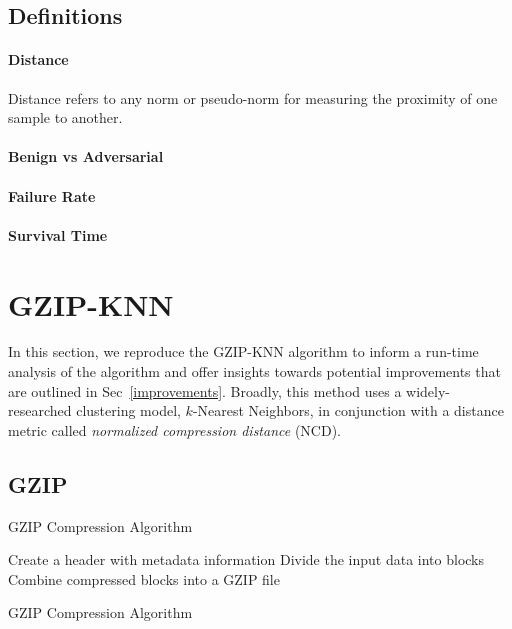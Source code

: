 \documentclass[sigconf]{acmart}
\begin{document}
\subsection{Definitions}
\paragraph{Distance}
Distance refers to any norm or pseudo-norm for measuring the proximity of one sample to another. 
\paragraph{Benign vs Adversarial}
\paragraph{Failure Rate}
\paragraph{Survival Time}

\section{GZIP-KNN}
In this section, we reproduce the GZIP-KNN algorithm to inform a run-time analysis of the algorithm and offer insights towards potential improvements that are outlined in Sec~\ref{improvements}. Broadly, this method uses a widely-researched clustering model, $k$-Nearest Neighbors, in conjunction with a  distance metric called \textit{normalized compression distance} (NCD). 


\subsection{GZIP}

\begin{algorithm}
    \caption{GZIP Compression Algorithm}
    Create a header with metadata information\;
    Divide the input data into blocks\;
    Combine compressed blocks into a GZIP file\;
    \caption{GZIP Compression Algorithm}
    \label{alg:gzip}
\end{algorithm}
\end{document}
